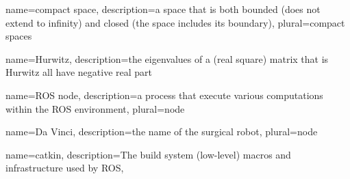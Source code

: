 {name={compact space},
 description={a space that is both bounded (does not extend to infinity) and closed (the space includes its boundary)},
 plural={compact spaces}
}

{name={Hurwitz},
 description={the eigenvalues of a (real square) matrix that is Hurwitz all have negative real part}
}

{name=ROS node,
 description={a process that execute various computations within the ROS environment},
 plural={node}
}


{name=Da Vinci,
 description={the name of the surgical robot},
 plural={node}
}

{name=catkin,
 description={The build system (low-level) macros and infrastructure used by ROS},
}


